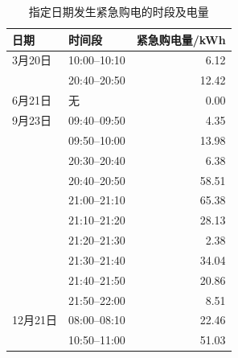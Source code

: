\begin{table}[H]
\centering
\caption{指定日期发生紧急购电的时段及电量}
\label{tab:q3_emergency}
\small
\setlength{\tabcolsep}{5pt}
\begin{tabular}{llr}
\toprule
日期 & 时间段 & 紧急购电量/kWh \\
\midrule
3月20日 & 10:00--10:10 & 6.12 \\
 & 20:40--20:50 & 12.42 \\
6月21日 & 无 & 0.00 \\
9月23日 & 09:40--09:50 & 4.35 \\
 & 09:50--10:00 & 13.98 \\
 & 20:30--20:40 & 6.38 \\
 & 20:40--20:50 & 58.51 \\
 & 21:00--21:10 & 65.38 \\
 & 21:10--21:20 & 28.13 \\
 & 21:20--21:30 & 2.38 \\
 & 21:30--21:40 & 34.04 \\
 & 21:40--21:50 & 20.86 \\
 & 21:50--22:00 & 8.51 \\
12月21日 & 08:00--08:10 & 22.46 \\
 & 10:50--11:00 & 51.03 \\
\bottomrule
\end{tabular}
\end{table}
